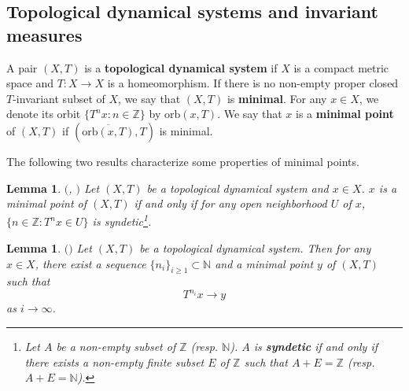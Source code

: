 \documentclass[reqno,12pt]{amsart}
\newtheorem{lemma}[thm]{Lemma}
\def \N {\mathbb N}
\def \Z {\mathbb Z}
\numberwithin{equation}{section}
\begin{document}
\subsection{Topological dynamical systems and invariant measures}
A pair $(X,T)$ is a \textbf{topological dynamical system} if $X$ is a compact metric space and $T:X\to X$ is a homeomorphism. If there is no non-empty proper closed $T$-invariant subset of $X$, we say that $(X,T)$ is \textbf{minimal}.
For any $x\in X$, we denote its orbit $\{T^{n}x:n\in\Z\}$ by $\text{orb}(x,T)$. We say that $x$ is a \textbf{minimal point} of $(X,T)$ if $(\overline{\text{orb}(x,T)},T)$ is minimal.

The following two results characterize some properties of minimal points.
\begin{lemma}\label{lem5}
	 $($\cite[Exercises 1.1.2]{G-book}, \cite{GH}$)$ Let  $(X,T)$ be a topological dynamical system and $x\in X$. $x$ is a minimal point of $(X,T)$ if and only if for any open neighborhood $U$ of $x$, $\{n\in \Z:T^{n}x\in U\}$ is syndetic\footnote{Let $A$ be a non-empty subset of $\Z$ (resp. $\N$). $A$ is \textbf{syndetic} if and only if there exists a non-empty finite subset $E$ of $\Z$ such that $A+E=\Z$ (resp. $A+E=\N$).}.
\end{lemma}
\begin{lemma}\label{lem4}
$($\cite[Theorem 8.7]{F-book}$)$ Let  $(X,T)$ be a topological dynamical system. Then for any $x\in X$, there exist a sequence $\{n_i\}_{i\ge 1}\subset \N$ and a minimal point $y$ of $(X,T)$ such that $$T^{n_i}x\to y$$ as $i\to\infty$.
\end{lemma}
\end{document}
